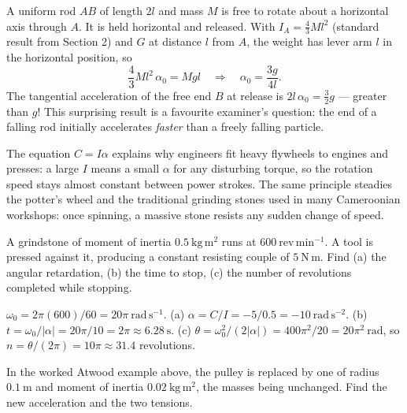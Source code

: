 \documentclass[11pt]{article}
\begin{document}
\begin{exemplebox}
A uniform rod $AB$ of length $2l$ and mass $M$ is free to rotate about a horizontal axis through $A$. It is held horizontal and released. With $I_A = \frac{4}{3}Ml^{2}$ (standard result from Section 2) and $G$ at distance $l$ from $A$, the weight has lever arm $l$ in the horizontal position, so
\[
\frac{4}{3}Ml^{2}\,\alpha_0 = Mgl \quad\Longrightarrow\quad \alpha_0 = \frac{3g}{4l}.
\]
The tangential acceleration of the free end $B$ at release is $2l\,\alpha_0 = \tfrac{3}{2}g$ --- greater than $g$! This surprising result is a favourite examiner's question: the end of a falling rod initially accelerates \emph{faster} than a freely falling particle.
\end{exemplebox}

\begin{savaistu}
The equation $C = I\alpha$ explains why engineers fit heavy flywheels to engines and presses: a large $I$ means a small $\alpha$ for any disturbing torque, so the rotation speed stays almost constant between power strokes. The same principle steadies the potter's wheel and the traditional grinding stones used in many Cameroonian workshops: once spinning, a massive stone resists any sudden change of speed.
\end{savaistu}

\begin{exercice}
A grindstone of moment of inertia $0.5\ \mathrm{kg\,m^{2}}$ runs at $600\ \mathrm{rev\,min^{-1}}$. A tool is pressed against it, producing a constant resisting couple of $5\ \mathrm{N\,m}$. Find (a) the angular retardation, (b) the time to stop, (c) the number of revolutions completed while stopping.
\end{exercice}

\begin{corrige}[Exercise 1]
$\omega_0 = 2\pi(600)/60 = 20\pi\ \mathrm{rad\,s^{-1}}$.
(a) $\alpha = C/I = -5/0.5 = -10\ \mathrm{rad\,s^{-2}}$.
(b) $t = \omega_0/|\alpha| = 20\pi/10 = 2\pi \approx 6.28\ \mathrm{s}$.
(c) $\theta = \omega_0^{2}/(2|\alpha|) = 400\pi^{2}/20 = 20\pi^{2}\ \mathrm{rad}$, so $n = \theta/(2\pi) = 10\pi \approx 31.4$ revolutions.
\end{corrige}

\begin{exercice}
In the worked Atwood example above, the pulley is replaced by one of radius $0.1\ \mathrm{m}$ and moment of inertia $0.02\ \mathrm{kg\,m^{2}}$, the masses being unchanged. Find the new acceleration and the two tensions.
\end{exercice}
\end{document}
